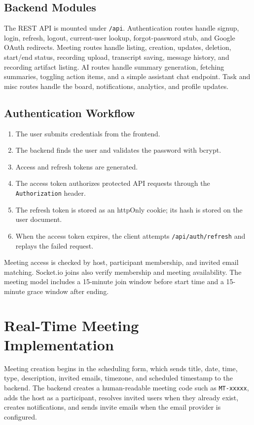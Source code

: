 \documentclass[11pt,a4paper]{article}
\begin{document}
\subsection{Backend Modules}
The REST API is mounted under \texttt{/api}. Authentication routes handle signup, login, refresh, logout, current-user lookup, forgot-password stub, and Google OAuth redirects. Meeting routes handle listing, creation, updates, deletion, start/end status, recording upload, transcript saving, message history, and recording artifact listing. AI routes handle summary generation, fetching summaries, toggling action items, and a simple assistant chat endpoint. Task and misc routes handle the board, notifications, analytics, and profile updates.

\subsection{Authentication Workflow}
\begin{enumerate}
  \item The user submits credentials from the frontend.
  \item The backend finds the user and validates the password with bcrypt.
  \item Access and refresh tokens are generated.
  \item The access token authorizes protected API requests through the \texttt{Authorization} header.
  \item The refresh token is stored as an httpOnly cookie; its hash is stored on the user document.
  \item When the access token expires, the client attempts \texttt{/api/auth/refresh} and replays the failed request.
\end{enumerate}

Meeting access is checked by host, participant membership, and invited email matching. Socket.io joins also verify membership and meeting availability. The meeting model includes a 15-minute join window before start time and a 15-minute grace window after ending.

\newpage

\section{Real-Time Meeting Implementation}
Meeting creation begins in the scheduling form, which sends title, date, time, type, description, invited emails, timezone, and scheduled timestamp to the backend. The backend creates a human-readable meeting code such as \texttt{MT-xxxxx}, adds the host as a participant, resolves invited users when they already exist, creates notifications, and sends invite emails when the email provider is configured.
\end{document}
